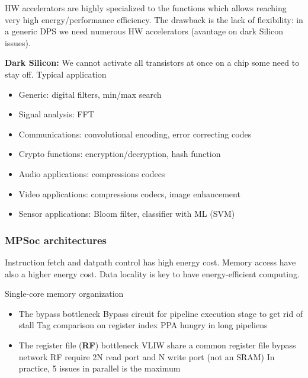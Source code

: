 HW accelerators are highly specialized to the functions which allows reaching very high energy/performance efficiency. The drawback is the lack of flexibility: in a generic DPS we need numerous HW accelerators (avantage on dark Silicon issues).

\textbf{Dark Silicon:} We cannot activate all transistors at once on a chip some need to stay off.
\bigbreak
Typical application
\begin{itemize}
  \item Generic: digital filters, min/max search
  \item Signal analysis: FFT
  \item Communications: convolutional encoding, error correcting codes
  \item Crypto functions: encryption/decryption, hash function
  \item Audio applications: compressions codecs
  \item Video applications: compressions codecs, image enhancement
  \item Sensor applications: Bloom filter, classifier with ML (SVM)
\end{itemize}

\subsubsection{MPSoc architectures}
Instruction fetch and datpath control has high energy cost. Memory access have also a higher energy cost. Data locality is key to have energy-efficient computing.



Single-core memory organization
\begin{itemize}
    \subitem Register file (2 read port + 1 write port)
    \subitem Two bottlenecks
    \subitem Separate L1 cache
    \subitem Single-bus L2 main memory
  \item The bypass bottleneck
    \subitem Bypass circuit for pipeline execution stage to get rid of stall
    \subitem Tag comparison on register index
    \subitem PPA hungry in long pipeliens
  \item The register file (\textbf{RF}) bottleneck
    \subitem VLIW share a common register file bypass network
    \subitem RF require 2N read port and N write port (not an SRAM)
    \subitem In practice, 5 issues in parallel is the maximum
\end{itemize}

